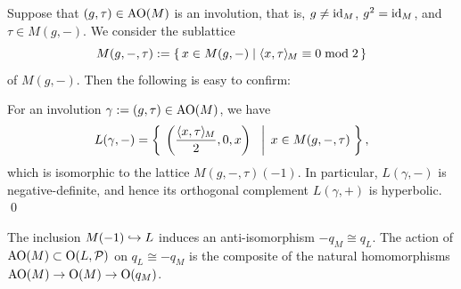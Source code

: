 \documentclass{amsart} %
\begin{document}
%
Suppose that $(g, \tau)\in \mathord{\mathrm{AO}}(M)$ is an involution, 
that is, $g\ne \mathord{\mathrm{id}}_M$, $g^2=\mathord{\mathrm{id}}_M$, and $\tau\in M(g, -)$.
We consider the sublattice 
\[
M(g, -,\tau):=\{\,{x\in M(g, -)}\mid {\langle x, \tau \rangle_{\hskip -1pt M}\equiv 0 \bmod 2} \,\}
\]
of $M(g, -)$.
Then the following is easy to confirm:
%
\begin{proposition}\label{prop:involL}
For an involution $\gamma:=(g, \tau)\in \mathord{\mathrm{AO}}(M)$, we have 
\[
L(\gamma, -)=\left\{\; \left. {\left(\frac{\langle x, \tau \rangle_{\hskip -1pt M}}{2}, 0, x\right)\;\;} \; \right\vert \; {x \in M(g, -,\tau)} \; \right \},
\]
which is isomorphic to  
the lattice $M(g, -,\tau)(-1)$.
In particular,  
$L(\gamma, -)$ is negative-definite,  and 
hence its orthogonal complement $L(\gamma, +)$ is hyperbolic.
\qed
\end{proposition}
%
\begin{remark}
The inclusion $M(-1)\hookrightarrow L$ induces an anti-isomorphism $-q_M\cong q_L$.
The action of $\mathord{\mathrm{AO}}(M)\subset \mathord{\mathrm{O}}(L, \mathord{\mathcal{P}})$ on $q_L\cong -q_M$ 
is the composite of the natural homomorphisms $\mathord{\mathrm{AO}}(M) \to \mathord{\mathrm{O}}(M)\to \mathord{\mathrm{O}}(q_M)$.
\end{remark}
%
\end{document}
